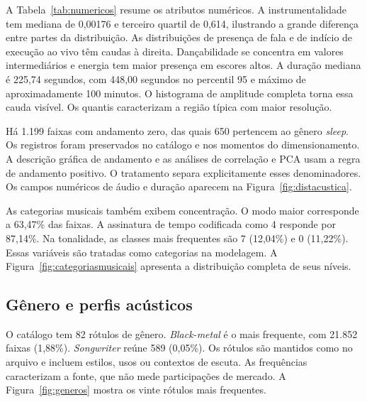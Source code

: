 
A Tabela~\ref{tab:numericos} resume os atributos numéricos. A instrumentalidade tem mediana de 0,00176 e terceiro quartil de 0,614, ilustrando a grande diferença entre partes da distribuição. As distribuições de presença de fala e de indício de execução ao vivo têm caudas à direita. Dançabilidade se concentra em valores intermediários e energia tem maior presença em escores altos. A duração mediana é 225,74 segundos, com 448,00 segundos no percentil 95 e máximo de aproximadamente 100 minutos. O histograma de amplitude completa torna essa cauda visível. Os quantis caracterizam a região típica com maior resolução.



Há 1.199 faixas com andamento zero, das quais 650 pertencem ao gênero \textit{sleep}. Os registros foram preservados no catálogo e nos momentos do dimensionamento. A descrição gráfica de andamento e as análises de correlação e PCA usam a regra de andamento positivo. O tratamento separa explicitamente esses denominadores. Os campos numéricos de áudio e duração aparecem na Figura~\ref{fig:distacustica}.

As categorias musicais também exibem concentração. O modo maior corresponde a 63,47\% das faixas. A assinatura de tempo codificada como 4 responde por 87,14\%. Na tonalidade, as classes mais frequentes são 7 (12,04\%) e 0 (11,22\%). Essas variáveis são tratadas como categorias na modelagem. A Figura~\ref{fig:categoriasmusicais} apresenta a distribuição completa de seus níveis.


\subsection{Gênero e perfis acústicos}
O catálogo tem 82 rótulos de gênero. \textit{Black-metal} é o mais frequente, com 21.852 faixas (1,88\%). \textit{Songwriter} reúne 589 (0,05\%). Os rótulos são mantidos como no arquivo e incluem estilos, usos ou contextos de escuta. As frequências caracterizam a fonte, que não mede participações de mercado. A Figura~\ref{fig:generos} mostra os vinte rótulos mais frequentes.

